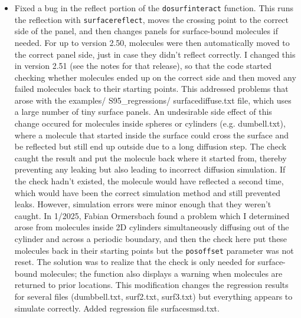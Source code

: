 \documentclass {scrbook}
\newcommand {\ttt} {\texttt}
\begin{document}
\begin{itemize}
\item Fixed a bug in the reflect portion of the \ttt{dosurfinteract} function. This runs the reflection with \ttt{surfacereflect}, moves the crossing point to the correct side of the panel, and then changes panels for surface-bound molecules if needed. For up to version 2.50, molecules were then automatically moved to the correct panel side, just in case they didn't reflect correctly. I changed this in version 2.51 (see the notes for that release), so that the code started checking whether molecules ended up on the correct side and then moved any failed molecules back to their starting points. This addressed problems that arose with the examples/ S95\_regressions/ surfacediffuse.txt file, which uses a large number of tiny surface panels. An undesirable side effect of this change occured for molecules inside spheres or cylinders (e.g. dumbell.txt), where a molecule that started inside the surface could cross the surface and be reflected but still end up outside due to a long diffusion step. The check caught the result and put the molecule back where it started from, thereby preventing any leaking but also leading to incorrect diffusion simulation. If the check hadn't existed, the molecule would have reflected a second time, which would have been the correct simulation method and still prevented leaks. However, simulation errors were minor enough that they weren't caught. In 1/2025, Fabian Ormersbach found a problem which I determined arose from molecules inside 2D cylinders simultaneously diffusing out of the cylinder and across a periodic boundary, and then the check here put these molecules back in their starting points but the \ttt{posoffset} parameter was not reset. The solution was to realize that the check is only needed for surface-bound molecules; the function also displays a warning when molecules are returned to prior locations. This modification changes the regression results for several files (dumbbell.txt, surf2.txt, surf3.txt) but everything appears to simulate correctly. Added regression file surfacesmsd.txt.
\end{itemize}
\end{document}
